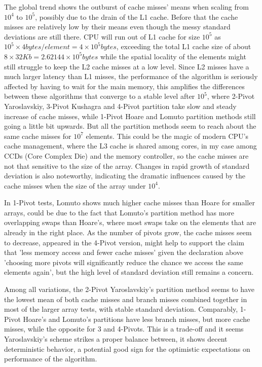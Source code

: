 \documentclass{article}
\begin{document}
The global trend shows the outburst of cache misses' means when scaling from $10^4$ to $10^5$, possibly due to the drain of the L1 cache.
Before that the cache misses are relatively low by their means even though the messy standard deviations are still there.
CPU will run out of L1 cache for size $10^5$ as $10^5 \times 4 bytes / element = 4 \times 10^5 bytes$, exceeding the total L1 cache size of about $8 \times 32Kb = 2.62144 \times 10^5 bytes$ while the spatial locality of the elements might still struggle to keep the L2 cache misses at a low level.
Since L2 misses have a much larger latency than L1 misses, the performance of the algorithm is seriously affected by having to wait for the main memory, this amplifies the differences between these algorithms that converge to a stable level after $10^5$, where 2-Pivot Yaroslavskiy, 3-Pivot Kushagra and 4-Pivot partition
take slow and steady increase of cache misses, while 1-Pivot Hoare and Lomuto partition methods still going a little bit upwards. But all the partition methods seem to reach about the same cache misses for $10^7$ elements. This could be the magic of modern CPU's cache management, where the L3 cache is shared among cores,
in my case among CCDs (Core Complex Die) and the memory controller, so the cache misses are not that sensitive to the size of the array.
Changes in rapid growth of standard deviation is also noteworthy, indicating the dramatic influences caused by the cache misses when the size of the array under $10^4$.

In 1-Pivot tests, Lomuto shows much higher cache misses than Hoare for smaller arrays, could be due to the fact that Lomuto's partition method has more overlapping swaps than Hoare's,
where most swaps take on the elements that are already in the right place. As the number of pivots grow, the cache misses seem to decrease, appeared in the 4-Pivot version,
might help to support the claim that 'less memory access and fewer cache misses' given the declaration above 'choosing more pivots will significantly reduce the chance we access the same elements again',
but the high level of standard deviation still remains a concern.

Among all variations, the 2-Pivot Yaroslavskiy's partition method seems to have the lowest mean of both cache misses and branch misses combined together in most of the larger array tests, with stable standard deviation.
Comparably, 1-Pivot Hoare's and Lomuto's partitions have less branch misses, but more cache misses, while the opposite for 3 and 4-Pivots. This is a trade-off and it seems Yaroslavskiy's scheme strikes a proper balance between,
it shows decent deterministic behavior, a potential good sign for the optimistic expectations on performance of the algorithm. 
\end{document}

